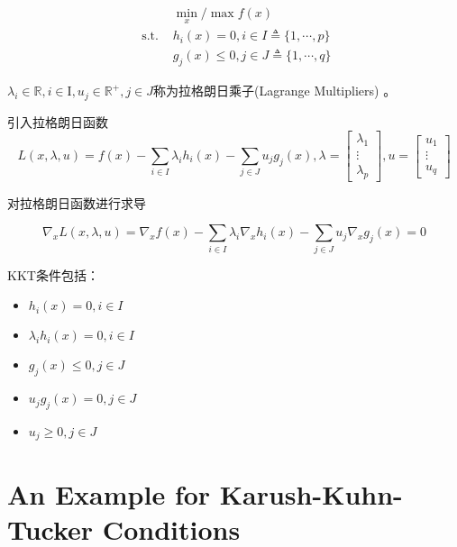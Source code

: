 \begin{definition}
    $$\begin{aligned}
        &\min _{x} / \max f(x) \\
\text{ s.t. } & h_{i}(x)=0, i \in I \triangleq\{1, \cdots, p\} \\
&g_{j}(x) \leq 0, j \in J \triangleq\{1, \cdots, q\}
    \end{aligned}$$

$ \lambda_{i} \in \mathbb{R}, i \in \mathrm{I}, u_{j} \in \mathbb{R}^{+}, j \in J $称为拉格朗日乘子(Lagrange Multipliers) 。

引入拉格朗日函数 $$ L(x, \lambda, u)=f(x)-\sum_{i \in I} \lambda_{i} h_{i}(x)-\sum_{j \in J} u_{j} g_{j}(x),  \lambda=\left[\begin{array}{c}\lambda_{1} \\ \vdots \\ \lambda_{p}\end{array}\right], u=\left[\begin{array}{c}u_{1} \\ \vdots \\ u_{q}\end{array}\right] $$

对拉格朗日函数进行求导

$$ \nabla_{x} L(x, \lambda, u)=\nabla_{x} f(x)-\sum_{i \in I} \lambda_{i} \nabla_{x} h_{i}(x)-\sum_{j \in J} u_{j} \nabla_{x} g_{j}(x)=0 $$
\end{definition}

\begin{theorem} KKT条件包括：
\begin{itemize}
    \item $ h_{i}(x)=0, i \in I $
    \item $ \lambda_{i} h_{i}(x)=0, i \in I $
    \item $ g_{j}(x) \leq 0, j \in J $
    \item $ u_{j} g_{j}(x)=0, j \in J $
    \item $ u_{j} \geq 0, j \in J $
\end{itemize}

\end{theorem}



\section{An Example for Karush-Kuhn-Tucker Conditions}

